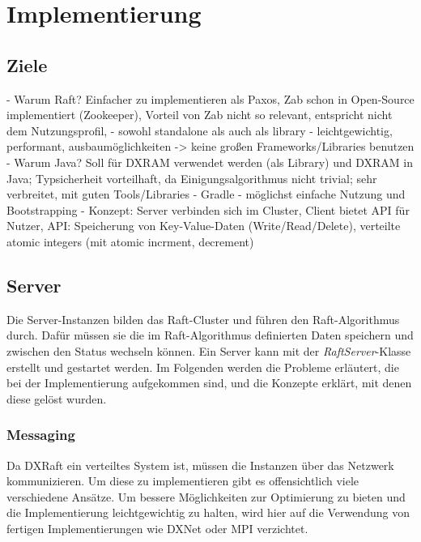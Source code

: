 \chapter{Implementierung}
\label{impl}

\section{Ziele}

- Warum Raft? Einfacher zu implementieren als Paxos, Zab schon in Open-Source implementiert (Zookeeper), Vorteil von Zab nicht so relevant, entspricht nicht dem Nutzungsprofil, 
- sowohl standalone als auch als library
- leichtgewichtig, performant, ausbaumöglichkeiten -> keine großen Frameworks/Libraries benutzen
- Warum Java? Soll für DXRAM verwendet werden (als Library) und DXRAM in Java; Typsicherheit vorteilhaft, da Einigungsalgorithmus nicht trivial; sehr verbreitet, mit guten Tools/Libraries
- Gradle
- möglichst einfache Nutzung und Bootstrapping
- Konzept: Server verbinden sich im Cluster, Client bietet API für Nutzer, API: Speicherung von Key-Value-Daten (Write/Read/Delete), verteilte atomic integers (mit atomic incrment, decrement)

\section{Server}

Die Server-Instanzen bilden das Raft-Cluster und führen den Raft-Algorithmus durch. Dafür müssen sie die im Raft-Algorithmus definierten Daten speichern und zwischen den Status wechseln können. Ein Server kann mit der \textit{RaftServer}-Klasse erstellt und gestartet werden. Im Folgenden werden die Probleme erläutert, die bei der Implementierung aufgekommen sind, und die Konzepte erklärt, mit denen diese gelöst wurden.

\subsection{Messaging}
\label{messaging}

Da DXRaft ein verteiltes System ist, müssen die Instanzen über das Netzwerk kommunizieren. Um diese zu implementieren gibt es offensichtlich viele verschiedene Ansätze. Um bessere Möglichkeiten zur Optimierung zu bieten und die Implementierung leichtgewichtig zu halten, wird hier auf die Verwendung von fertigen Implementierungen wie DXNet oder MPI verzichtet.

